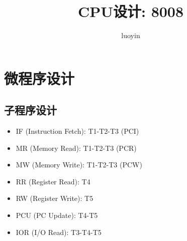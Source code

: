 \documentclass[10pt]{book}
\begin{document}


\newcommand{\red}[1]{\textcolor[rgb]{1.0, 0.0, 0.0}{#1}}
\newcommand{\green}[1]{\textcolor[rgb]{0.0, 1.0, 0.0}{#1}}
\newcommand{\blue}[1]{\textcolor[rgb]{0.0, 0.0, 1.0}{#1}}
\newcommand{\mypath}[1]{/home/luoyin/Notes2016/ECG_Analysis/{#1}/}

\title{CPU设计: 8008}
\author{luoyin}
\date{}
\maketitle

\tableofcontents

\chapter{微程序设计}
\section{子程序设计}
\begin{itemize}
  \item IF (Instruction Fetch): T1-T2-T3 (PCI)
  \item MR (Memory Read): T1-T2-T3 (PCR)
  \item MW (Memory Write): T1-T2-T3 (PCW)
  \item RR (Register Read): T4
  \item RW (Register Write): T5
  \item PCU (PC Update): T4-T5
  \item IOR (I/O Read): T3-T4-T5
\end{itemize}
\end{document}

